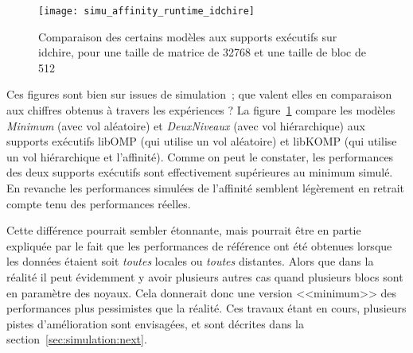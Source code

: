 \begin{figure}[t!]
  \centering
  \texttt{[image: simu\_affinity\_runtime\_idchire]}
  \caption{Comparaison des certains modèles aux supports exécutifs sur idchire, pour une taille de matrice de 32768 et une taille de bloc de 512}\label{fig:simu:modeles-vs-runtime:idchire}
\end{figure}


Ces figures sont bien sur issues de simulation~; que valent elles en comparaison aux chiffres obtenus à travers les expériences ?
La figure~\ref{fig:simu:modeles-vs-runtime:idchire} compare les modèles \emph{Minimum} (avec vol aléatoire) et \emph{DeuxNiveaux} (avec vol hiérarchique) aux supports exécutifs libOMP (qui utilise un vol aléatoire) et libKOMP (qui utilise un vol hiérarchique et l'affinité).
Comme on peut le constater, les performances des deux supports exécutifs sont effectivement supérieures au minimum simulé. En revanche les performances simulées de l'affinité semblent légèrement en retrait compte tenu des performances réelles.

Cette différence pourrait sembler étonnante, mais pourrait être en partie expliquée par le fait que les performances de référence ont été obtenues lorsque les données étaient soit \textit{toutes} locales ou \textit{toutes} distantes.
Alors que dans la réalité il peut évidemment y avoir plusieurs autres cas quand plusieurs blocs sont en paramètre des noyaux.
Cela donnerait donc une version <<minimum>> des performances plus pessimistes que la réalité.
Ces travaux étant en cours, plusieurs pistes d'amélioration sont envisagées, et sont décrites dans la section~\ref{sec:simulation:next}.





